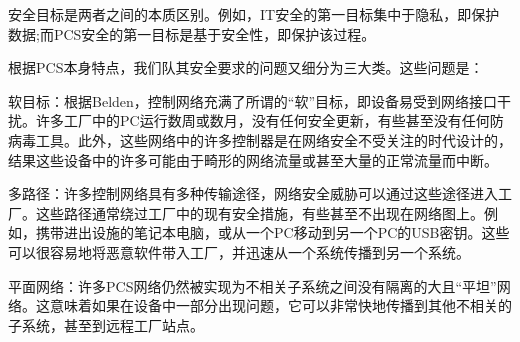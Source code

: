 安全目标是两者之间的本质区别。例如，IT安全的第一目标集中于隐私，即保护数据;而PCS安全的第一目标是基于安全性，即保护该过程。

根据PCS本身特点，我们队其安全要求的问题又细分为三大类。这些问题是：

软目标：根据Belden，控制网络充满了所谓的“软”目标，即设备易受到网络接口干扰。许多工厂中的PC运行数周或数月，没有任何安全更新，有些甚至没有任何防病毒工具。此外，这些网络中的许多控制器是在网络安全不受关注的时代设计的，结果这些设备中的许多可能由于畸形的网络流量或甚至大量的正常流量而中断。

多路径：许多控制网络具有多种传输途径，网络安全威胁可以通过这些途径进入工厂。这些路径通常绕过工厂中的现有安全措施，有些甚至不出现在网络图上。例如，携带进出设施的笔记本电脑，或从一个PC移动到另一个PC的USB密钥。这些可以很容易地将恶意软件带入工厂，并迅速从一个系统传播到另一个系统。

平面网络：许多PCS网络仍然被实现为不相关子系统之间没有隔离的大且“平坦”网络。这意味着如果在设备中一部分出现问题，它可以非常快地传播到其他不相关的子系统，甚至到远程工厂站点。

